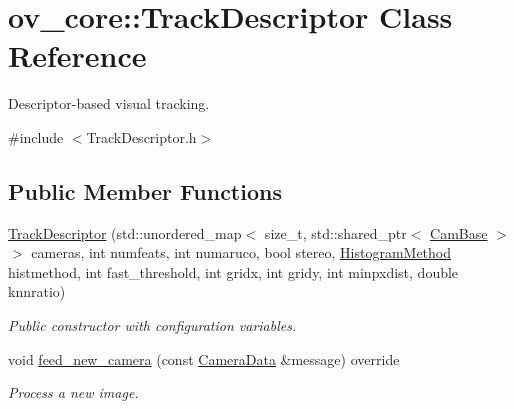 \hypertarget{classov__core_1_1TrackDescriptor}{}\section{ov\+\_\+core\+:\+:Track\+Descriptor Class Reference}
\label{classov__core_1_1TrackDescriptor}


Descriptor-\/based visual tracking.  




{\ttfamily \#include $<$Track\+Descriptor.\+h$>$}

\subsection*{Public Member Functions}
\begin{DoxyCompactItemize}
\item 
\hyperlink{classov__core_1_1TrackDescriptor_a5f7793abdb80621d2d41e619cd46b9cf}{Track\+Descriptor} (std\+::unordered\+\_\+map$<$ size\+\_\+t, std\+::shared\+\_\+ptr$<$ \hyperlink{classov__core_1_1CamBase}{Cam\+Base} $>$$>$ cameras, int numfeats, int numaruco, bool stereo, \hyperlink{classov__core_1_1TrackBase_aa4b34a5dce99b59522d57bf9278c9a1a}{Histogram\+Method} histmethod, int fast\+\_\+threshold, int gridx, int gridy, int minpxdist, double knnratio)
\begin{DoxyCompactList}\small\item\em Public constructor with configuration variables. \end{DoxyCompactList}\item 
void \hyperlink{classov__core_1_1TrackDescriptor_afcbf3078992f740582eac24e3164e6f1}{feed\+\_\+new\+\_\+camera} (const \hyperlink{structov__core_1_1CameraData}{Camera\+Data} \&message) override
\begin{DoxyCompactList}\small\item\em Process a new image. \end{DoxyCompactList}\end{DoxyCompactItemize}
